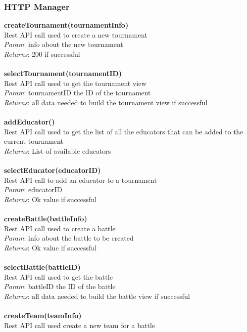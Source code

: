 \documentclass{article}
\begin{document}
\subsubsection{HTTP Manager}
\textbf{createTournament(tournamentInfo)}\\
Rest API call used to create a new tournament\\
\textit{Param}: info about the new tournament\\
\textit{Returns}: 200 if successful\\
\\
\textbf{selectTournament(tournamentID)}\\
Rest API call used to get the  tournament view\\
\textit{Param}: tournamentID the ID of the tournament\\
\textit{Returns}: all data needed to build the tournament view if successful\\
\\
\textbf{addEducator()}\\
Rest API call used to get the list of all the educators that can be added to the current tournament\\
\textit{Returns}: List of available educators\\
\\
\textbf{selectEducator(educatorID)}\\
Rest API call to add an educator to a tournament\\
\textit{Param}: educatorID\\
\textit{Returns}: Ok value if successful\\
\\
\textbf{createBattle(battleInfo)}\\
Rest API call used to create a battle\\
\textit{Param}: info about the battle to be created\\
\textit{Returns}: Ok value if successful\\
\\
\textbf{selectBattle(battleID)}\\
Rest API call used to get the battle\\
\textit{Param}: battleID the ID of the battle\\
\textit{Returns}: all data needed to build the battle view if successful\\
\\
\textbf{createTeam(teamInfo)}\\
Rest API call used create a new team for a battle\\
\end{document}
